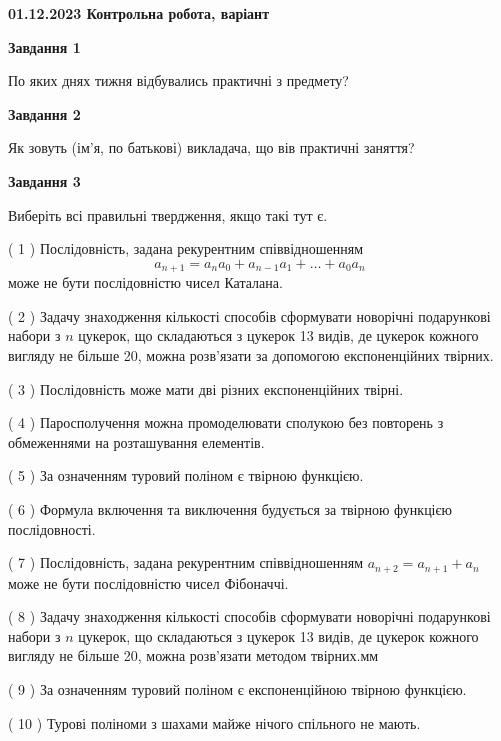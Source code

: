\documentclass[12pt, ukrainian]{article}
\begin{document}
\begin {large}

\textbf{01.12.2023 Контрольна робота, варіант  }\par


{
{\begin {center}\textbf{Завдання 1}\end {center}}\par
По яких днях тижня відбувались практичні з предмету?\par
{\begin {center}\textbf{Завдання 2}\end {center}}\par
Як зовуть (ім'я, по батькові) викладача, що вів практичні заняття?\par
{\begin {center}\textbf{Завдання 3}\end {center}}\par
Виберіть всі правильні твердження, якщо такі тут є.\par
\vspace{2mm}
( 1 ) Послідовність, задана рекурентним співвідношенням $$a_{n+1}=a_{n}a_{0}+a_{n-1}a_{1}+\ldots+a_0a_{n}$$ може не бути послідовністю чисел Каталана.%

( 2 ) Задачу знаходження кількості способів сформувати новорічні подарункові набори з $n$ цукерок, що складаються з цукерок 13 видів, де цукерок кожного вигляду не більше 20, можна розв’язати за допомогою експоненційних твірних.%

( 3 ) Послідовність може мати дві різних експоненційних твірні.%

( 4 ) Паросполучення можна промоделювати сполукою без повторень з обмеженнями на розташування елементів.%

( 5 ) За означенням туровий поліном є твірною функцією.%

( 6 ) Формула включення та виключення будується за твірною функцією послідовності.%

( 7 ) Послідовність, задана рекурентним співвідношенням $a_{n+2}=a_{n+1}+a_{n}$ може не бути послідовністю чисел Фібоначчі.%

( 8 ) Задачу знаходження кількості способів сформувати новорічні подарункові набори з $n$ цукерок, що складаються з цукерок 13 видів, де цукерок кожного вигляду не більше 20, можна розв’язати методом твірних.мм%

( 9 ) За означенням туровий поліном є експоненційною твірною функцією.%

( 10 ) Турові поліноми з шахами майже нічого спільного не мають.%
}
\end {large}

\vspace{4mm}
\newpage
\end{document}
